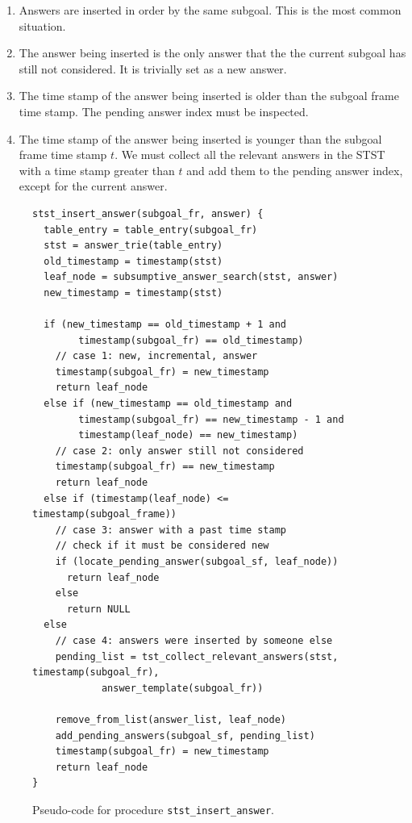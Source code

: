 \begin{enumerate}
   \item Answers are inserted in order by the same subgoal. This is the most common situation.
   \item The answer being inserted is the only answer that the the current subgoal has still not considered.
   It is trivially set as a new answer.
   \item The time stamp of the answer being inserted is older than the subgoal frame time stamp.
   The pending answer index must be inspected.
   \item The time stamp of the answer being inserted is younger than the subgoal frame time stamp $t$.
   We must collect all the relevant answers in the STST with a time stamp greater than $t$
   and add them to the pending answer index, except for the current answer.
\end{enumerate}

\begin{figure}[ht]
\begin{Verbatim}
stst_insert_answer(subgoal_fr, answer) {
  table_entry = table_entry(subgoal_fr)
  stst = answer_trie(table_entry)
  old_timestamp = timestamp(stst)
  leaf_node = subsumptive_answer_search(stst, answer)
  new_timestamp = timestamp(stst)
  
  if (new_timestamp == old_timestamp + 1 and
        timestamp(subgoal_fr) == old_timestamp)
    // case 1: new, incremental, answer
    timestamp(subgoal_fr) = new_timestamp
    return leaf_node
  else if (new_timestamp == old_timestamp and
        timestamp(subgoal_fr) == new_timestamp - 1 and
        timestamp(leaf_node) == new_timestamp)
    // case 2: only answer still not considered
    timestamp(subgoal_fr) == new_timestamp
    return leaf_node
  else if (timestamp(leaf_node) <= timestamp(subgoal_frame))
    // case 3: answer with a past time stamp
    // check if it must be considered new
    if (locate_pending_answer(subgoal_sf, leaf_node))
      return leaf_node
    else
      return NULL
  else
    // case 4: answers were inserted by someone else
    pending_list = tst_collect_relevant_answers(stst, timestamp(subgoal_fr),
            answer_template(subgoal_fr))
    
    remove_from_list(answer_list, leaf_node)
    add_pending_answers(subgoal_sf, pending_list)
    timestamp(subgoal_fr) = new_timestamp
    return leaf_node
}
\end{Verbatim}
\caption{Pseudo-code for procedure \texttt{stst\_insert\_answer}.}
\label{fig:stst_insert_answer}
\end{figure}

